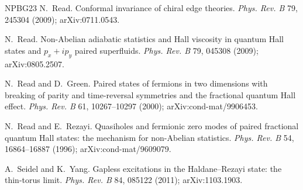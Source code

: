 \begin{thebibliography}{NPBG23}
N.~Read.
\newblock Conformal invariance of chiral edge theories.
\newblock \emph{Phys. Rev. B} 79, 245304 (2009); arXiv:0711.0543.

N.~Read.
\newblock Non-Abelian adiabatic statistics and Hall viscosity in quantum Hall states and $p_x+ip_y$ paired
superfluids.
\newblock \emph{Phys. Rev. B} 79, 045308 (2009); arXiv:0805.2507.

N.~Read and D.~Green.
\newblock Paired states of fermions in two dimensions with breaking of parity and time-reversal symmetries and
the fractional quantum Hall effect.
\newblock \emph{Phys. Rev. B} 61, 10267--10297 (2000); arXiv:cond-mat/9906453.

N.~Read and E.~Rezayi.
\newblock Quasiholes and fermionic zero modes of paired fractional quantum Hall states: the mechanism for
non-Abelian statistics.
\newblock \emph{Phys. Rev. B} 54, 16864--16887 (1996); arXiv:cond-mat/9609079.

A.~Seidel and K.~Yang.
\newblock Gapless excitations in the Haldane--Rezayi state: the thin-torus limit.
\newblock \emph{Phys. Rev. B} 84, 085122 (2011); arXiv:1103.1903.

\end{thebibliography}
